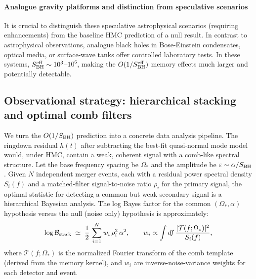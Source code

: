 \documentclass[a4paper,11pt]{article}
\newcommand{\HMC}{\textsc{HMC}\xspace}
\theoremstyle{plain}
\theoremstyle{definition}
\theoremstyle{remark}
\begin{document}
\paragraph{Analogue gravity platforms and distinction from speculative scenarios}
It is crucial to distinguish these speculative astrophysical scenarios (requiring enhancements) from the baseline \HMC{} prediction of a null result.
In contrast to astrophysical observations, analogue black holes in Bose-Einstein condensates, optical media, or surface-wave tanks offer controlled laboratory tests. In these systems, $S_{\rm BH}^{\rm eff} \sim 10^3$--$10^6$, making the $O(1/S_{\rm BH}^{\rm eff})$ memory effects much larger and potentially detectable.

\subsection{Observational strategy: hierarchical stacking and optimal comb filters}
\label{ssec:obs}
We turn the $O(1/S_{\rm BH})$ prediction into a concrete data analysis pipeline. The ringdown residual $h(t)$ after subtracting the best-fit quasi-normal mode model would, under \HMC{}, contain a weak, coherent signal with a comb-like spectral structure. Let the base frequency spacing be $\Omega_\ast$ and the amplitude be $\varepsilon\sim \alpha/S_{\rm BH}$. Given $N$ independent merger events, each with a residual power spectral density $S_i(f)$ and a matched-filter signal-to-noise ratio $\rho_i$ for the primary signal, the optimal statistic for detecting a common but weak secondary signal is a hierarchical Bayesian analysis. The log Bayes factor for the common $(\Omega_\ast,\alpha)$ hypothesis versus the null (noise only) hypothesis is approximately:
\begin{equation}
\log \mathcal{B}_{\rm stack}\;\simeq\; \frac{1}{2}\,\sum_{i=1}^N w_i\, \rho_i^2\,\alpha^2,
\qquad
w_i \propto \int df\,\frac{|\mathcal{T}(f;\Omega_\ast)|^2}{S_i(f)},
\label{eq:stacking}
\end{equation}
where $\mathcal{T}(f;\Omega_\ast)$ is the normalized Fourier transform of the comb template (derived from the memory kernel), and $w_i$ are inverse-noise-variance weights for each detector and event.
\end{document}
